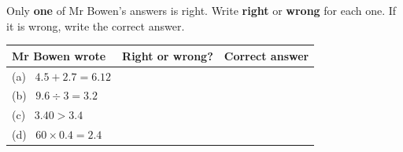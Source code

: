 \documentclass[12pt,a4paper]{article}
\newif\iffr
\newcommand{\fr}[1]{\unskip\iffr\par\vspace{1pt}\noindent{\small\itshape\color{black!60}#1}\par\fi}
\newcommand{\frl}[2]{\iffr#2\else#1\fi}
\begin{document}
\noindent\begin{minipage}{\textwidth}
Only \textbf{one} of Mr Bowen's answers is right. Write \textbf{right} or
\textbf{wrong} for each one. If it is wrong, write the correct answer.
\fr{Une seule r\'eponse de Mr Bowen est juste. \'Ecris \eng{right} (juste) ou
\eng{wrong} (faux) pour chacune. Si elle est fausse, \'ecris la bonne r\'eponse.}

\vspace{4pt}
{\renewcommand{\arraystretch}{\frl{1.35}{1.8}}%
\noindent
\begin{tabularx}{\textwidth}{|L|C{3.6cm}|C{4.6cm}|}
  \hline
  \textbf{Mr Bowen wrote} & \textbf{Right or wrong?} & \textbf{Correct answer} \\
  \hline
  (a) \ $4.5 + 2.7 = 6.12$ & & \\ \hline
  (b) \ $9.6 \div 3 = 3.2$ & & \\ \hline
  (c) \ $3.40 > 3.4$ & & \\ \hline
  (d) \ $60 \times 0.4 = 2.4$ & & \\ \hline
\end{tabularx}}
\end{minipage}


\end{document}
